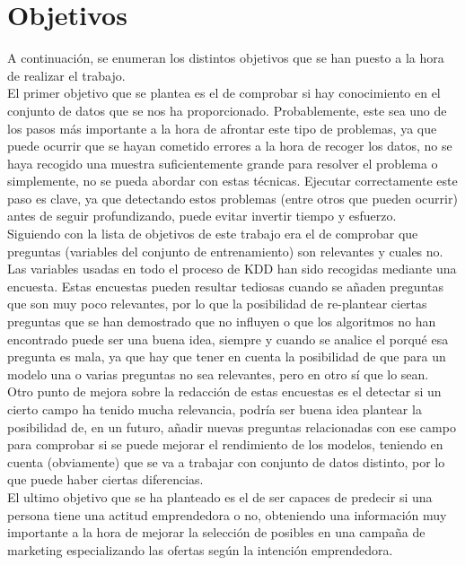 \section{Objetivos}
\label{sec:obj}
A continuación, se enumeran los distintos objetivos que se han puesto a la hora de realizar el trabajo. \\
\linebreak
El primer objetivo que se plantea es el de comprobar si hay conocimiento en el conjunto de datos que se nos ha proporcionado. Probablemente, este sea uno de los pasos más importante a la hora de afrontar este tipo de problemas, ya que puede ocurrir que se hayan cometido errores a la hora de recoger los datos, no se haya recogido una muestra suficientemente grande para resolver el problema o simplemente, no se pueda abordar con estas técnicas. Ejecutar correctamente este paso es clave, ya que detectando estos problemas (entre otros que pueden ocurrir) antes de seguir profundizando, puede evitar invertir tiempo y esfuerzo.\\
\linebreak
Siguiendo con la lista de objetivos de este trabajo era el de comprobar que preguntas (variables del conjunto de entrenamiento) son relevantes y cuales no. Las variables usadas en todo el proceso de KDD han sido recogidas mediante una encuesta. Estas encuestas pueden resultar tediosas cuando se añaden preguntas que son muy poco relevantes, por lo que la posibilidad de re-plantear ciertas preguntas que se han demostrado que no influyen o que los algoritmos no han encontrado puede ser una buena idea, siempre y cuando se analice el porqué esa pregunta es mala, ya que hay que tener en cuenta la posibilidad de que para un modelo una o varias preguntas no sea relevantes, pero en otro  sí que lo sean.\\
\linebreak
Otro punto de mejora sobre la redacción de estas encuestas es el detectar si un cierto campo ha tenido mucha relevancia, podría ser buena idea plantear la posibilidad de, en un futuro, añadir nuevas preguntas relacionadas con ese campo para comprobar si se puede mejorar el rendimiento de los modelos, teniendo en cuenta (obviamente) que se va a trabajar con conjunto de datos distinto, por lo que puede haber ciertas diferencias.\\
\linebreak
El ultimo objetivo que se ha planteado es el de ser capaces de predecir si una persona tiene una actitud emprendedora o no, obteniendo una información muy importante a la hora de mejorar la selección de posibles en una campaña de marketing especializando las ofertas según la intención emprendedora. \\ 
\pagebreak
